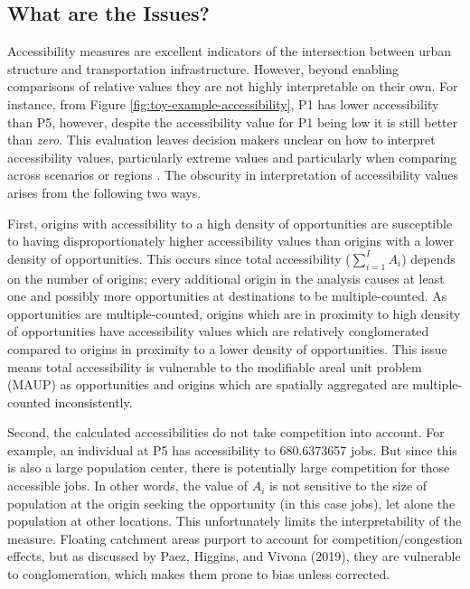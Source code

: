 \documentclass[]{elsarticle} %
\begin{document}
\hypertarget{what-are-the-issues}{%
\subsection{What are the Issues?}\label{what-are-the-issues}}

Accessibility measures are excellent indicators of the intersection
between urban structure and transportation infrastructure. However,
beyond enabling comparisons of relative values they are not highly
interpretable on their own. For instance, from Figure
\ref{fig:toy-example-accessibility}, P1 has lower accessibility than P5,
however, despite the accessibility value for P1 being low it is still
better than \emph{zero}. This evaluation leaves decision makers unclear
on how to interpret accessibility values, particularly extreme values
and particularly when comparing across scenarios or regions . The
obscurity in interpretation of accessibility values arises from the
following two ways.

First, origins with accessibility to a high density of opportunities are
susceptible to having disproportionately higher accessibility values
than origins with a lower density of opportunities. This occurs since
total accessibility (\(\sum_{i=1}^IA_i\)) depends on the number of
origins; every additional origin in the analysis causes at least one and
possibly more opportunities at destinations to be multiple-counted. As
opportunities are multiple-counted, origins which are in proximity to
high density of opportunities have accessibility values which are
relatively conglomerated compared to origins in proximity to a lower
density of opportunities. This issue means total accessibility is
vulnerable to the modifiable areal unit problem (MAUP) as opportunities
and origins which are spatially aggregated are multiple-counted
inconsistently.

Second, the calculated accessibilities do not take competition into
account. For example, an individual at P5 has accessibility to
680.6373657 jobs. But since this is also a large population center,
there is potentially large competition for those accessible jobs. In
other words, the value of \(A_i\) is not sensitive to the size of
population at the origin seeking the opportunity (in this case jobs),
let alone the population at other locations. This unfortunately limits
the interpretability of the measure. Floating catchment areas purport to
account for competition/congestion effects, but as discussed by Paez,
Higgins, and Vivona (2019), they are vulnerable to conglomeration, which
makes them prone to bias unless corrected.
\end{document}
